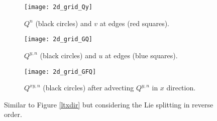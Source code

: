\begin{figure}[!htb]
	\centering
	\begin{subfigure}{0.3\textwidth}
		\centering
		\texttt{[image: 2d\_grid\_Qy]}
		\caption{$Q^n$ (black circles) and $v$ at edges (red squares). \label{lt-Qy}}
	\end{subfigure}
	\begin{subfigure}{0.3\textwidth}
		\centering
		\texttt{[image: 2d\_grid\_GQ]}
		\caption{$Q^{y,n}$ (black circles) and $u$ at edges (blue squares).\label{lt-GQy} }
	\end{subfigure}
	\begin{subfigure}{0.3\textwidth}
		\centering
		\texttt{[image: 2d\_grid\_GFQ]}
		\caption{$Q^{xy,n}$ (black circles) after advecting $Q^{y,n}$ in $x$ direction. \label{lt-FGQy}}
	\end{subfigure}
	\caption{Similar to Figure \ref{ltxdir} but considering the Lie splitting in reverse order.}
\end{figure}

